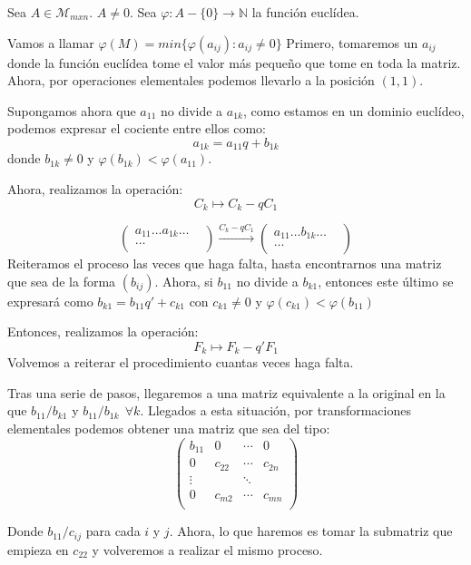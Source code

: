 \documentclass[11pt, a4paper, titlepage]{article}
\newif\IfInSansMode
\providecommand{\nat}{\mathbb{N}}
\theoremstyle{theorem-style}
\theoremstyle{definition-style}
\theoremstyle{remark-style}
\theoremstyle{example-style}
\begin{document}
Sea $A \in \mathcal{M}_{mxn}$. $A \ne 0$. Sea $\varphi:A -\{0\} \to \nat$ la función euclídea.

Vamos a llamar $\varphi(M) = min\{\varphi(a_{ij}) : a_{ij} \ne 0\}$
Primero, tomaremos un $a_{ij}$ donde la función euclídea tome el valor más pequeño que tome en toda la matriz. Ahora, por operaciones elementales podemos llevarlo a la posición $(1,1)$.

Supongamos ahora que $a_{11}$ no divide a $a_{1k}$, como estamos en un dominio euclídeo, podemos expresar el cociente entre ellos como:
\[
a_{1k} = a_{11}q+ b_{1k}
\]
donde $b_{1k} \ne 0$ y $\varphi(b_{1k}) < \varphi(a_{11})$.

Ahora, realizamos la operación:
\[
C_k \mapsto C_k - q C_1
\]

		\[ \begin{pmatrix}
			 a_{11} \hdots  a_{1k} \hdots \\
			   \hdots &  \\
		\end{pmatrix}
		\xrightarrow{C_k - qC_1}
		\begin{pmatrix}
			 a_{11} \hdots  b_{1k} \hdots \\
			   \hdots &  \\
		\end{pmatrix}
\]
Reiteramos el proceso las veces que haga falta, hasta encontrarnos una matriz que sea de la forma $(b_{ij})$. Ahora, si $b_{11}$ no divide a $b_{k1}$, entonces este último se expresará como $b_{k1} = b_{11}q' + c_{k1}$ con $c_{k1}\ne 0$ y $\varphi(c_{k1}) < \varphi(b_{11})$

Entonces, realizamos la operación:
\[
F_k \mapsto F_k - q'F_1
\]
Volvemos a reiterar el procedimiento cuantas veces haga falta.

Tras una serie de pasos, llegaremos a una matriz equivalente a la original en la que $b_{11}/b_{k1}$ y $b_{11}/b_{1k} \ \ \forall k$. Llegados a esta situación, por transformaciones elementales podemos obtener una matriz que sea del tipo:
\[
\begin{pmatrix}
 b_{11} & 0 & \cdots & 0 \\
 0 & c_{22} & \cdots & c_{2n} \\
 \vdots &  & \ddots& \\
 0 & c_{m2} & \cdots & c_{mn} \\
\end{pmatrix}
\]

Donde $b_{11}/ c_{ij}$ para cada $i$ y $j$. Ahora, lo que haremos es tomar la submatriz que empieza en $c_{22}$ y volveremos a realizar el mismo proceso.
\end{document}
